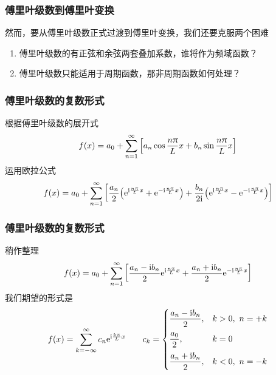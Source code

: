 \begin{frame}
    \frametitle{傅里叶级数到傅里叶变换}
    然而，要从傅里叶级数正式过渡到傅里叶变换，我们还要克服两个困难
    \begin{enumerate}
        \item 傅里叶级数的有正弦和余弦两套叠加系数，谁将作为频域函数？
        \item 傅里叶级数只能适用于周期函数，那非周期函数如何处理？
    \end{enumerate}
\end{frame}

\begin{frame}
    \frametitle{傅里叶级数的复数形式}
    根据傅里叶级数的展开式
    \begin{equation}
        f(x)
        =a_0+\Sum[n=1][\infty]{\qty[a_n\cos\frac{n\pi}{L}x+b_n\sin\frac{n\pi}{L}x]}
    \end{equation}
    运用欧拉公式
    \begin{equation}
        f(x)=a_0+\Sum[n=1][\infty]{\qty[
                    \frac{a_n}{2}\qty(
                    \e^{\i\frac{n\pi}{L}x}+
                    \e^{-\i\frac{n\pi}{L}x})+
                    \frac{b_n}{2\i}\qty(
                    \e^{\i\frac{n\pi}{L}x}-
                    \e^{-\i\frac{n\pi}{L}x})]}
    \end{equation}
\end{frame}

\begin{frame}
    \frametitle{傅里叶级数的复数形式}
    稍作整理
    \begin{equation}
        f(x)=a_0+\Sum[n=1][\infty]{\qty[
                    \frac{a_n-\i b_n}{2}
                    \e^{\i\frac{n\pi}{L}x}+
                    \frac{a_n+\i b_n}{2}
                    \e^{-\i\frac{n\pi}{L}x}]}
    \end{equation}
    我们期望的形式是
    \begin{equation}
        f(x)=\Sum[k=-\infty][\infty]{c_n\e^{\i\frac{k\pi}{L}x}}\qquad
        c_k=
        \begin{cases}
            \mal{\frac{a_n-\i b_n}{2}},&k>0,~n=+k\\[3mm]
            \mal{\frac{a_0}{2}},&k=0\\[3mm]
            \mal{\frac{a_n+\i b_n}{2}},&k<0,~n=-k
        \end{cases}
    \end{equation}
\end{frame}

